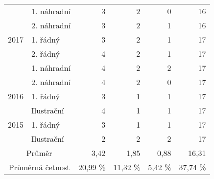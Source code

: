 \begin{table}[p]
\begin{center}
\begin{tabular}{|l|l|r|r|r|r|}
			\multicolumn{ 1}{|l|}{} & 1. náhradní  & 3 & 2 & 0 & 16 \\ \cline{ 2- 6}
			\multicolumn{ 1}{|l|}{} & 2. náhradní  & 3 & 2 & 1 & 16 \\ \hline
			\multicolumn{ 1}{|c|}{2017} & 1. řádný  & 3 & 2 & 1 & 17 \\ \cline{ 2- 6}
			\multicolumn{ 1}{|l|}{} & 2. řádný  & 4 & 2 & 1 & 17 \\ \cline{ 2- 6}
			\multicolumn{ 1}{|l|}{} & 1. náhradní  & 4 & 2 & 2 & 17 \\ \cline{ 2- 6}
			\multicolumn{ 1}{|l|}{} & 2. náhradní  & 4 & 2 & 0 & 17 \\ \hline
			\multicolumn{ 1}{|c|}{2016} & 1. řádný  & 3 & 1 & 1 & 17 \\ \cline{ 2- 6}
			\multicolumn{ 1}{|l|}{} & Ilustrační & 4 & 1 & 1 & 17 \\ \hline
			\multicolumn{ 1}{|c|}{2015} & 1. řádný  & 3 & 1 & 1 & 17 \\ \cline{ 2- 6}
			\multicolumn{ 1}{|l|}{} & Ilustrační & 2 & 2 & 2 & 17 \\ \hline
			\multicolumn{ 2}{|c|}{Průměr} & 3,42 & 1,85 & 0,88 & 16,31 \\ \hline
			\multicolumn{ 2}{|c|}{Průměrná četnost} & 20,99 \% & 11,32 \% & 5,42 \% & 37,74 \% \\ \hline
		\end{tabular}
	\end{center}
	\label{tab:6ulo}
\end{table}

